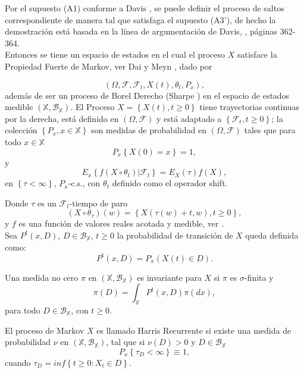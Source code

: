 Por el supuesto (A1) conforme a Davis \cite{Davis}, se puede
definir el proceso de saltos correspondiente de manera tal que
satisfaga el supuesto (A3'), de hecho la demostraci\'on est\'a
basada en la l\'inea de argumentaci\'on de Davis, \cite{Davis},
p\'aginas 362-364.\\

Entonces se tiene un espacio de estados en el cual el proceso $X$
satisface la Propiedad Fuerte de Markov, ver Dai y Meyn
\cite{DaiSean}, dado por

\[\left(\Omega,\mathcal{F},\mathcal{F}_{t},X\left(t\right),\theta_{t},P_{x}\right),\]
adem\'as de ser un proceso de Borel Derecho (Sharpe \cite{Sharpe})
en el espacio de estados medible
$\left(\mathbb{X},\mathcal{B}_\mathbb{X}\right)$. El Proceso
$X=\left\{X\left(t\right),t\geq0\right\}$ tiene trayectorias
continuas por la derecha, est\'a definido en
$\left(\Omega,\mathcal{F}\right)$ y est\'a adaptado a
$\left\{\mathcal{F}_{t},t\geq0\right\}$; la colecci\'on
$\left\{P_{x},x\in \mathbb{X}\right\}$ son medidas de probabilidad
en $\left(\Omega,\mathcal{F}\right)$ tales que para todo $x\in
\mathbb{X}$
\[P_{x}\left\{X\left(0\right)=x\right\}=1,\] y
\[E_{x}\left\{f\left(X\circ\theta_{t}\right)|\mathcal{F}_{t}\right\}=E_{X}\left(\tau\right)f\left(X\right),\]
en $\left\{\tau<\infty\right\}$, $P_{x}$-c.s., con $\theta_{t}$
definido como el operador shift.


Donde $\tau$ es un $\mathcal{F}_{t}$-tiempo de paro
\[\left(X\circ\theta_{\tau}\right)\left(w\right)=\left\{X\left(\tau\left(w\right)+t,w\right),t\geq0\right\},\]
y $f$ es una funci\'on de valores reales acotada y medible, ver \cite{Dai, KaspiMandelbaum}.\\

Sea $P^{t}\left(x,D\right)$, $D\in\mathcal{B}_{\mathbb{X}}$,
$t\geq0$ la probabilidad de transici\'on de $X$ queda definida
como:
\[P^{t}\left(x,D\right)=P_{x}\left(X\left(t\right)\in
D\right).\]


\begin{Def}
Una medida no cero $\pi$ en
$\left(\mathbb{X},\mathcal{B}_{\mathbb{X}}\right)$ es invariante
para $X$ si $\pi$ es $\sigma$-finita y
\[\pi\left(D\right)=\int_{\mathbb{X}}P^{t}\left(x,D\right)\pi\left(dx\right),\]
para todo $D\in \mathcal{B}_{\mathbb{X}}$, con $t\geq0$.
\end{Def}

\begin{Def}
El proceso de Markov $X$ es llamado Harris Recurrente si existe
una medida de probabilidad $\nu$ en
$\left(\mathbb{X},\mathcal{B}_{\mathbb{X}}\right)$, tal que si
$\nu\left(D\right)>0$ y $D\in\mathcal{B}_{\mathbb{X}}$
\[P_{x}\left\{\tau_{D}<\infty\right\}\equiv1,\] cuando
$\tau_{D}=inf\left\{t\geq0:X_{t}\in D\right\}$.
\end{Def}

